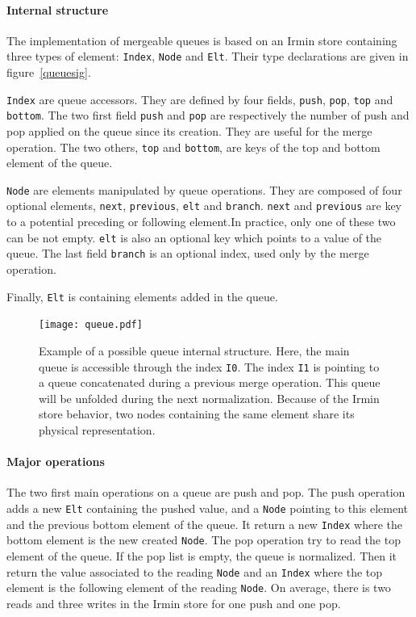 \documentclass{article}
\renewcommand{\-}{\hyp}
\newcommand{\irmin}{Irmin\xspace}
\newcommand{\code}[1]{\texttt{#1}}
\begin{document}
\paragraph{Internal structure}
The implementation of mergeable queues is based on an \irmin store containing three types of element: \code{Index}, \code{Node} and \code{Elt}. Their type declarations are given in figure~\ref{queuesig}.

\code{Index} are queue accessors.
They are defined by four fields, \code{push}, \code{pop}, \code{top} and \code{bottom}.
The two first field \code{push} and \code{pop} are respectively the number of push and pop applied on the queue since its creation.
They are useful for the merge operation.
The two others, \code{top} and \code{bottom}, are keys of the top and bottom element of the queue.

\code{Node} are elements manipulated by queue operations.
They are composed of four optional elements, \code{next}, \code{previous}, \code{elt} and \code{branch}. \code{next} and \code{previous} are key to a potential preceding or following element.In practice, only one of these two can be not empty. \code{elt} is also an optional key which points to a value of the queue. The last field \code{branch} is an optional index, used only by the merge operation.

Finally, \code{Elt} is containing elements added in the queue.

\begin{figure}[hbt]
\centering
\texttt{[image: queue.pdf]}
\caption{Example of a possible queue internal structure. Here, the main queue is accessible through the index \code{I0}. The index \code{I1} is pointing to a queue concatenated during a previous merge operation. This queue will be unfolded during the next normalization. Because of the \irmin store behavior,  two nodes containing the same element share its physical representation.}
\label{queuegraph}
\end{figure}

\paragraph{Major operations}
The two first main operations on a queue are push and pop.
The push operation adds a new \code{Elt} containing the pushed value, and a \code{Node} pointing to this element and the previous bottom element of the queue.
It return a new \code{Index} where the bottom element is the new created \code{Node}.
The pop operation try to read the top element of the queue.
If the pop list is empty, the queue is normalized.
Then it return the value associated to the reading \code{Node} and an \code{Index} where the top element is the following element of the reading \code{Node}.
On average, there is two reads and three writes in the \irmin store for one push and one pop.
\end{document}
